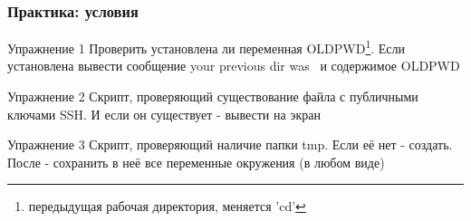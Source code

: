 \begin{frame}[fragile]
  \frametitle{Практика: условия}

  \alert{Упражнение 1} Проверить установлена ли переменная OLDPWD\footnote{передыдущая рабочая директория, меняется 'cd'}. Если установлена вывести сообщение \textquotedbl your previous dir was \textquotedbl\  и содержимое OLDPWD \pause

  \alert{Упражнение 2} Скрипт, проверяющий существование файла с публичными ключами SSH. И если он существует - вывести на экран  \pause

  \alert{Упражнение 3} Скрипт, проверяющий наличие папки tmp. Если её нет - создать. После - сохранить в неё все переменные окружения (в любом виде)
\end{frame}
